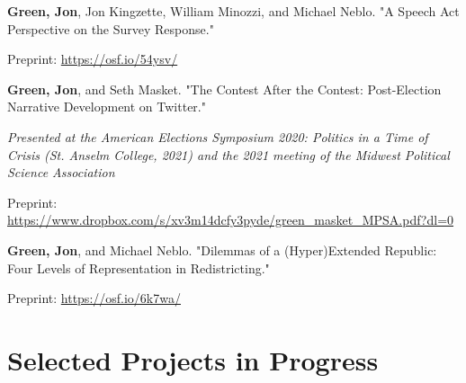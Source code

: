 \documentclass[letterpaper]{article}
\renewenvironment{itemize}{
  \begin{list}{}{
    \setlength{\leftmargin}{1.5em}
  }
}{
  \end{list}
}
\begin{document}
\begin{itemize}
\item \textbf{Green, Jon}, Jon Kingzette, William Minozzi, and Michael Neblo. "A Speech Act Perspective on the Survey Response." 
\begin{itemize}
\item Preprint: \url{https://osf.io/54ysv/}
\end{itemize}

\item \textbf{Green, Jon}, and Seth Masket. "The Contest After the Contest: Post-Election Narrative Development on Twitter." 
\begin{itemize}
\item \textit{Presented at the American Elections Symposium 2020: Politics in a Time of Crisis (St. Anselm College, 2021) and the 2021 meeting of the Midwest Political Science Association}
\item Preprint: \url{https://www.dropbox.com/s/xv3m14dcfy3pyde/green_masket_MPSA.pdf?dl=0}
\end{itemize}

\item \textbf{Green, Jon}, and Michael Neblo. "Dilemmas of a (Hyper)Extended Republic: Four Levels of Representation in Redistricting." 
\begin{itemize}
\item Preprint: \url{https://osf.io/6k7wa/}
\end{itemize}

\end{itemize}

\section*{Selected Projects in Progress}
\end{document}
